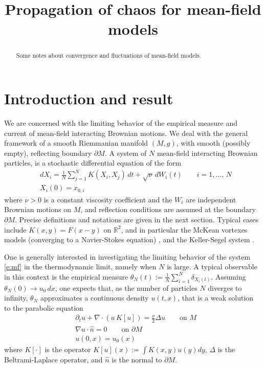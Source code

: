 \documentclass[reqno]{amsart}
\title{Propagation of chaos for mean-field models}
\numberwithin{equation}{section}
\numberwithin{theorem}{section}
\newcommand{\bb}[1]{{\mathbb #1}}
\newcommand{\bel}[2]{\begin{equation} \label{#1} \begin{split} #2
 \end{split} \end{equation}}
\newcommand{\visc}{\nu}
\begin{document}
\begin{abstract}
Some notes about convergence and fluctuations of mean-field models.
\end{abstract}

\maketitle

\section{Introduction and result}
\label{s:1}
We are concerned with the limiting behavior of the empirical measure and current of mean-field interacting Brownian motions. We deal with the general framework of a smooth Riemmanian manifold $(M,g)$, with smooth (possibly empty), reflecting boundary $\partial M$. A system of $N$ mean-field interacting Brownian particles, is a stochastic differential equation of the form
\bel{e:mf}{
& dX_i= \frac 1N\sum_{j=1}^N K(X_i,X_j)\,dt+\sqrt{\visc}\, dW_i(t) \qquad i=1,\ldots,\,N
\\
& X_i(0)=x_{0,i}
}
where
$\visc>0$ is a constant viscosity coefficient and the $W_i$ are independent Brownian motions on $M$, and reflection conditions are assumed at the boundary $\partial M$. Precise definitions and notations are given in the next section. Typical cases include $K(x,y)=F(x-y)$ on $\bb R^2$, and in particular the McKean vortexes models (converging to a Navier-Stokes equation) \cite{Mc}, and the Keller-Segel system \cite{KS}.

One is generally interested in investigating the limiting behavior of the system \eqref{e:mf} in the thermodynamic limit, namely when $N$ is large. A typical observable in this context is the empirical measure $\theta_N(t):=\tfrac 1N \sum_{i=1}^N \delta_{X_i(t)}$. Assuming $\theta_N(0)\to u_0\,dx$, one expects that, as the number of particles $N$ diverges to infinity,  $\theta_N$ approximates a continuous density $u(t,x)$, that is a weak solution to the parabolic equation
\bel{e:gng}{
& \partial_t u+\nabla \cdot \left(u \,K[u]\right)=\frac{\visc}2 \Delta u\qquad \text{on $M$}
\\
& \nabla u\cdot \hat n=0 \qquad \text{on $\partial M$}
\\
& u(0,x)=u_0(x)
}
where $K[\cdot]$ is the operator $K[u](x):=\int K(x,y)u(y)dy$,
 $\Delta$ is the Beltrami-Laplace operator, and $\hat n$ is the normal to $\partial M$.
 
\end{document}
